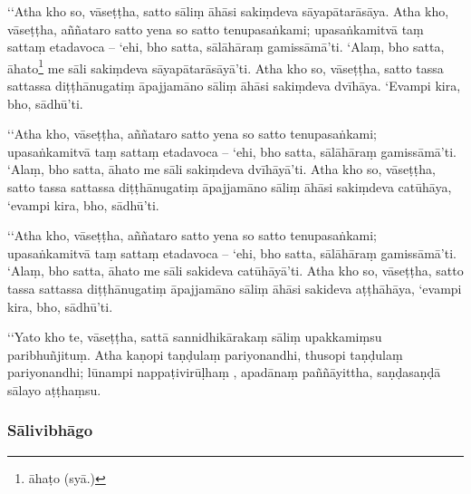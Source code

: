 ‘‘Atha kho so, vāseṭṭha, satto sāliṃ āhāsi sakiṃdeva sāyapātarāsāya. Atha kho, vāseṭṭha, aññataro satto yena so satto tenupasaṅkami; upasaṅkamitvā taṃ sattaṃ etadavoca – ‘ehi, bho satta, sālāhāraṃ gamissāmā’ti. ‘Alaṃ, bho satta, āhato\footnote{āhaṭo (syā.)} me sāli sakiṃdeva sāyapātarāsāyā’ti. Atha kho so, vāseṭṭha, satto tassa sattassa diṭṭhānugatiṃ āpajjamāno sāliṃ āhāsi sakiṃdeva dvīhāya. ‘Evampi kira, bho, sādhū’ti.

‘‘Atha kho, vāseṭṭha, aññataro satto yena so satto tenupasaṅkami; upasaṅkamitvā taṃ sattaṃ etadavoca – ‘ehi, bho satta, sālāhāraṃ gamissāmā’ti. ‘Alaṃ, bho satta, āhato me sāli sakiṃdeva dvīhāyā’ti. Atha kho so, vāseṭṭha, satto tassa sattassa diṭṭhānugatiṃ āpajjamāno sāliṃ āhāsi sakiṃdeva catūhāya, ‘evampi kira, bho, sādhū’ti.

‘‘Atha kho, vāseṭṭha, aññataro satto yena so satto tenupasaṅkami; upasaṅkamitvā taṃ sattaṃ etadavoca – ‘ehi, bho satta, sālāhāraṃ gamissāmā’ti. ‘Alaṃ, bho satta, āhato me sāli sakideva catūhāyā’ti. Atha kho so, vāseṭṭha, satto tassa sattassa diṭṭhānugatiṃ āpajjamāno sāliṃ āhāsi sakideva aṭṭhāhāya, ‘evampi kira, bho, sādhū’ti.

‘‘Yato kho te, vāseṭṭha, sattā sannidhikārakaṃ sāliṃ upakkamiṃsu paribhuñjituṃ. Atha kaṇopi taṇḍulaṃ pariyonandhi, thusopi taṇḍulaṃ pariyonandhi; lūnampi nappaṭivirūḷhaṃ , apadānaṃ paññāyittha, saṇḍasaṇḍā sālayo aṭṭhaṃsu.

\subsubsection{Sālivibhāgo}

